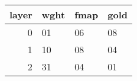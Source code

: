 \begin{tabular}{rlll}
\toprule
 layer & wght & fmap & gold \\
\midrule
     0 &   01 &   06 &   08 \\
     1 &   10 &   08 &   04 \\
     2 &   31 &   04 &   01 \\
\bottomrule
\end{tabular}
